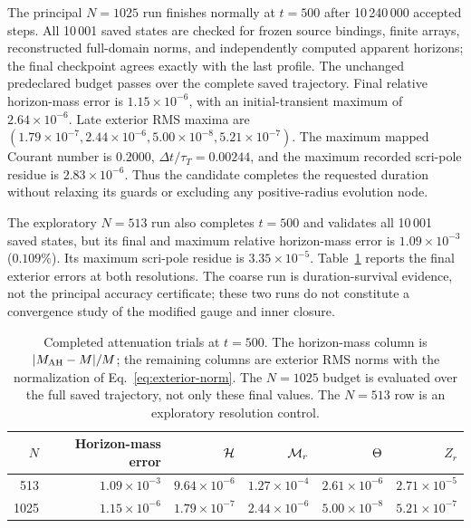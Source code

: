 The principal $N=1025$ run finishes normally at $t=500$ after 10\,240\,000 accepted steps. All 10\,001 saved states are checked for frozen source bindings, finite arrays, reconstructed full-domain norms, and independently computed apparent horizons; the final checkpoint agrees exactly with the last profile. The unchanged predeclared budget passes over the complete saved trajectory. Final relative horizon-mass error is $1.15\times10^{-6}$, with an initial-transient maximum of $2.64\times10^{-6}$. Late exterior RMS maxima are $(1.79\times10^{-7},2.44\times10^{-6},5.00\times10^{-8},5.21\times10^{-7})$. The maximum mapped Courant number is $0.2000$, $\Delta t/\tau_T=0.00244$, and the maximum recorded scri-pole residue is $2.83\times10^{-6}$. Thus the candidate completes the requested duration without relaxing its guards or excluding any positive-radius evolution node.

The exploratory $N=513$ run also completes $t=500$ and validates all 10\,001 saved states, but its final and maximum relative horizon-mass error is $1.09\times10^{-3}$ ($0.109\%$). Its maximum scri-pole residue is $3.35\times10^{-5}$. Table~\ref{tab:repair-duration} reports the final exterior errors at both resolutions. The coarse run is duration-survival evidence, not the principal accuracy certificate; these two runs do not constitute a convergence study of the modified gauge and inner closure.

\begin{table}[tbp]
\caption{Completed attenuation trials at $t=500$. The horizon-mass column is $|M_{\rm AH}-M|/M$; the remaining columns are exterior RMS norms with the normalization of Eq.~\eqref{eq:exterior-norm}. The $N=1025$ budget is evaluated over the full saved trajectory, not only these final values. The $N=513$ row is an exploratory resolution control.}
\label{tab:repair-duration}
\begin{ruledtabular}
\begin{tabular}{rrrrrr}
$N$ & Horizon-mass error & $\mathcal H$ & $\mathcal M_r$ & $\Theta$ & $Z_r$\\
\hline
513 & $1.09\times10^{-3}$ & $9.64\times10^{-6}$ & $1.27\times10^{-4}$ & $2.61\times10^{-6}$ & $2.71\times10^{-5}$\\
1025 & $1.15\times10^{-6}$ & $1.79\times10^{-7}$ & $2.44\times10^{-6}$ & $5.00\times10^{-8}$ & $5.21\times10^{-7}$
\end{tabular}
\end{ruledtabular}
\end{table}

